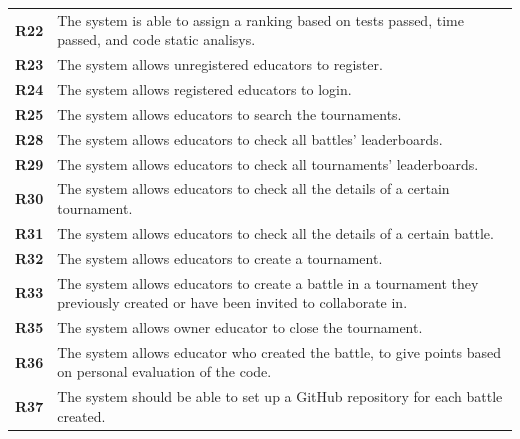 \documentclass[12pt, a4paper]{report}
\begin{document}
\begin{table}[H]
\begin{tabularx}{\textwidth}{cX}
        \textbf{R22}  & The system is able to assign a ranking based on tests passed, time passed, and code static analisys.                            \\
        \textbf{R23}  & The system allows unregistered educators to register.                                                                           \\
        \textbf{R24}  & The system allows registered educators to login.                                                                                \\
        \textbf{R25}  & The system allows educators to search the tournaments.                                                                          \\
        \textbf{R28}  & The system allows educators to check all battles' leaderboards.                                                                 \\
        \textbf{R29}  & The system allows educators to check all tournaments' leaderboards.                                                             \\
        \textbf{R30}  & The system allows educators to check all the details of a certain tournament.                                                   \\
        \textbf{R31}  & The system allows educators to check all the details of a certain battle.                                                       \\
        \textbf{R32}  & The system allows educators to create a tournament.                                                                             \\
        \textbf{R33}  & The system allows educators to create a battle in a tournament they previously created or have been invited to collaborate in.  \\
        \textbf{R35}  & The system allows owner educator to close the tournament.                                                                       \\
        \textbf{R36}  & The system allows educator who created the battle, to give points based on personal evaluation of the code.                     \\
        \textbf{R37}  & The system should be able to set up a GitHub repository for each battle created.                                                \\
    \end{tabularx}
    \end{table}
\end{document}
